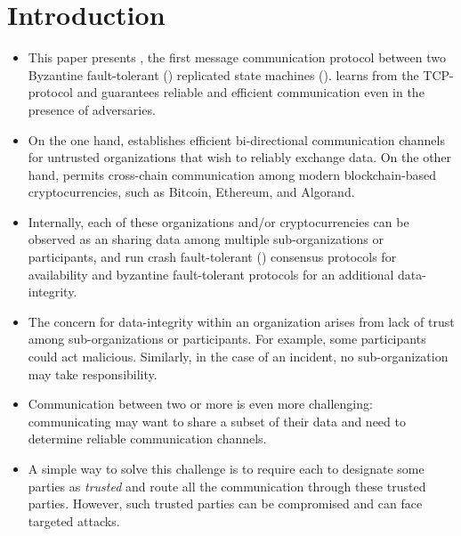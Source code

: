 \section{Introduction}
\begin{itemize}
\item This paper presents \Shadow{}, the first message communication protocol 
between two Byzantine fault-tolerant (\BFT{}) replicated state machines (\RSM{}). 
\Shadow{} learns from the TCP-protocol and guarantees reliable and efficient 
communication even in the presence of adversaries.

\item On the one hand, \Shadow{} establishes efficient bi-directional communication channels 
for untrusted organizations that wish to reliably exchange data. 
On the other hand, \Shadow{} permits cross-chain communication among modern blockchain-based cryptocurrencies, 
such as Bitcoin, Ethereum, and Algorand.

\item Internally, each of these organizations and/or cryptocurrencies can 
be observed as an \RSM{} sharing data among multiple sub-organizations or participants, and 
run crash fault-tolerant (\CFT{}) consensus protocols for availability and 
byzantine fault-tolerant protocols for an additional data-integrity.

\item The concern for data-integrity within an organization arises 
from lack of trust among sub-organizations or participants. 
For example, some participants could act malicious.
Similarly, in the case of an incident, no sub-organization may take responsibility. 



\item Communication between two or more  is even more challenging:
communicating  may want to share a subset of their data and
need to determine reliable communication channels. 

\item A simple way to solve this challenge is to require each \RSM{} to designate 
some parties as {\em trusted} and route all the communication through these 
trusted parties.
However, such trusted parties can be compromised and can face targeted attacks. 



\end{itemize}
